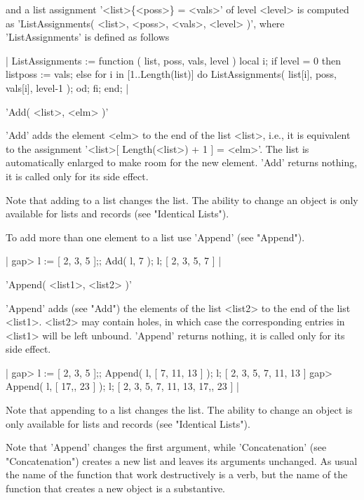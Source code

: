 and  a  list assignment '<list>\{<poss>\} \:= <vals>' of level <level> is
computed  as 'ListAssignments( <list>, <poss>, <vals>, <level> )',  where
'ListAssignments' is defined as follows

|    ListAssignments := function ( list, poss, vals, level )
        local  i;
        if level = 0  then
            list{poss} := vals;
        else
            for i  in [1..Length(list)]  do
                ListAssignments( list[i], poss, vals[i], level-1 );
            od;
        fi;
    end; |

%

'Add( <list>, <elm> )'

'Add' adds the element <elm>  to the end of  the list <list>, i.e., it is
equivalent to  the assignment '<list>[  Length(<list>) + 1 ] \:=  <elm>'.
The list is  automatically enlarged  to  make room  for the new  element.
'Add' returns nothing, it is called only for its side effect.

Note that adding to  a list changes the list.   The ability to change  an
object is only available for lists and records (see "Identical Lists").

To add more than one element to a list use 'Append' (see "Append").

|    gap> l := [ 2, 3, 5 ];;  Add( l, 7 );  l;
    [ 2, 3, 5, 7 ] |

%
%

'Append( <list1>, <list2> )'

'Append' adds (see "Add") the elements of the list <list2>  to the end of
the list <list1>.   <list2>   may  contain   holes, in which   case   the
corresponding entries in <list1>  will be left unbound.  'Append' returns
nothing, it is called only for its side effect.

|    gap> l := [ 2, 3, 5 ];; Append( l, [ 7, 11, 13 ] );  l;
    [ 2, 3, 5, 7, 11, 13 ]
    gap> Append( l, [ 17,, 23 ] ); l;
    [ 2, 3, 5, 7, 11, 13, 17,, 23 ] |

Note that appending to a list changes the list.  The ability to change an
object is only available for lists and records (see "Identical Lists").

Note that 'Append' changes the first argument, while 'Concatenation' (see
"Concatenation") creates  a new list and  leaves its arguments unchanged.
As usual the name of the function that work  destructively is a verb, but
the name of the function that creates a new object is a substantive.

